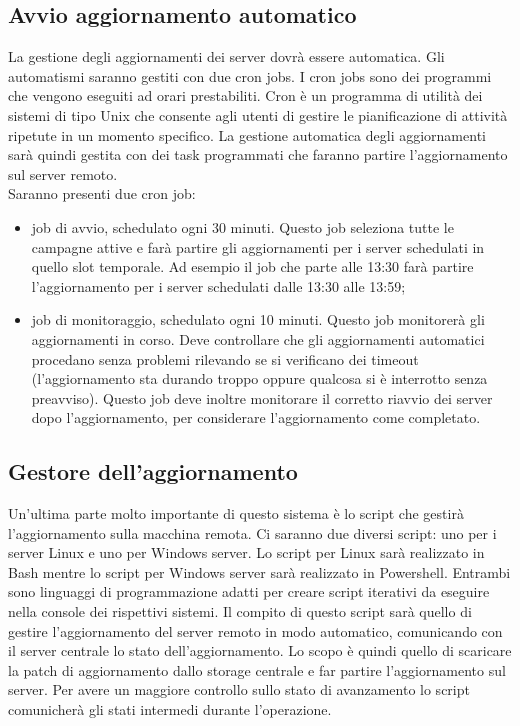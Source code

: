 \subsection{Avvio aggiornamento automatico}
La gestione degli aggiornamenti dei server dovrà essere automatica. 
Gli automatismi saranno gestiti con due cron jobs. I cron jobs sono 
dei programmi che vengono eseguiti ad orari prestabiliti. Cron è un programma di
utilità dei sistemi di tipo Unix che consente agli utenti di gestire 
le pianificazione di attività ripetute in un momento specifico.
La gestione automatica degli aggiornamenti sarà quindi gestita con 
dei task programmati che faranno partire l’aggiornamento sul server remoto.\\

\noindent Saranno presenti due cron job:
\begin{itemize}
\item job di avvio, schedulato ogni 30 minuti. Questo job seleziona tutte 
le campagne attive e farà partire gli aggiornamenti per i server schedulati 
in quello slot temporale. Ad esempio il job che parte alle 13:30 farà 
partire l’aggiornamento per i server schedulati dalle 13:30 alle 13:59; 
\item job di monitoraggio, schedulato ogni 10 minuti. Questo job monitorerà gli 
aggiornamenti in corso. Deve controllare che gli aggiornamenti automatici
procedano senza problemi rilevando se si verificano dei timeout 
(l’aggiornamento sta durando troppo oppure qualcosa si è interrotto 
senza preavviso). Questo job deve inoltre monitorare il corretto riavvio 
dei server dopo l’aggiornamento, per considerare l’aggiornamento 
come completato.
\end{itemize}


\subsection{Gestore dell’aggiornamento}
Un’ultima parte molto importante di questo sistema è lo script che gestirà 
l’aggiornamento sulla macchina remota. Ci saranno due diversi script: 
uno per i server Linux e uno per Windows server.
Lo script per Linux sarà realizzato in Bash mentre lo script per Windows 
server sarà realizzato in Powershell. Entrambi sono linguaggi di 
programmazione adatti per creare script iterativi da eseguire nella 
console dei rispettivi sistemi.
Il compito di questo script sarà quello di gestire l'aggiornamento del 
server remoto in modo automatico, comunicando con il server centrale lo 
stato dell’aggiornamento.
Lo scopo è quindi quello di scaricare la patch di aggiornamento dallo 
storage centrale e far partire l’aggiornamento sul server.
Per avere un maggiore controllo sullo stato di avanzamento lo script 
comunicherà gli stati intermedi durante l’operazione.\\

